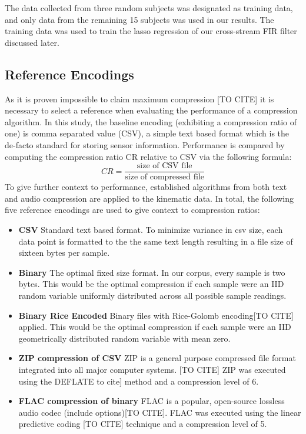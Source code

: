 \documentclass[journal]{IEEEtran}
\begin{document}
The data collected from three random subjects was designated as training data, and only data from the remaining 15 subjects was used in our results. The training data was used to train the lasso regression of our cross-stream FIR filter discussed later.



\subsection{Reference Encodings}
As it is proven impossible to claim maximum compression [TO CITE] it is necessary to select a reference when evaluating the performance of a compression algorithm. In this study, the baseline encoding (exhibiting a compression ratio of one) is comma separated value (CSV), a simple text based format which is the de-facto standard for storing sensor information. Performance is compared by computing the compression ratio CR relative to CSV via the following formula:
$$CR = \frac{\textrm{size of CSV file}}{\textrm{size of compressed file}}$$
To give further context to performance, established algorithms from both text and audio compression are applied to the kinematic data. In total, the following five reference encodings are used to give context to compression ratios:

\begin{itemize}
  \item \textbf{CSV} Standard text based format. To minimize variance in csv size, each data point is formatted to the the same text length resulting in a file size of sixteen bytes per sample.
  \item \textbf{Binary} The optimal fixed size format. In our corpus, every sample is two bytes. This would be the optimal compression if each sample were an IID random variable uniformly distributed across all possible sample readings.
  \item \textbf{Binary Rice Encoded} Binary files with Rice-Golomb encoding[TO CITE] applied. This would be the optimal compression if each sample were an IID geometrically distributed random variable with mean zero.
  \item \textbf{ZIP compression of CSV} ZIP is a general purpose compressed file format integrated into all major computer systems. [TO CITE] ZIP was executed using the DEFLATE to cite] method and a compression level of 6.
  \item \textbf{FLAC compression of binary} FLAC is a popular, open-source lossless audio codec (include options)[TO CITE]. FLAC was executed using the linear predictive coding [TO CITE] technique and a compression level of 5.
\end{itemize}
\end{document}

